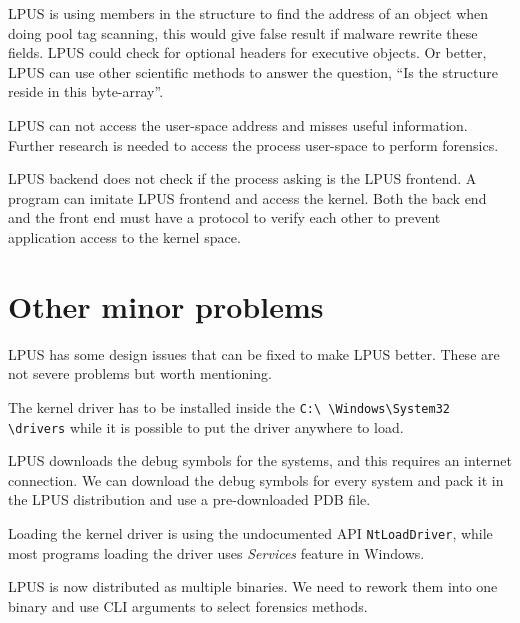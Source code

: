 LPUS is using members in the structure to find the address of an object when
doing pool tag scanning, this would give false result if malware rewrite these
fields.  LPUS could check for optional headers for executive objects. Or
better, LPUS can use other scientific methods to answer the question, ``Is the
structure reside in this byte-array''.

LPUS can not access the user-space address and misses useful information.
Further research is needed to access the process user-space to perform
forensics.

LPUS backend does not check if the process asking is the LPUS frontend. A
program can imitate LPUS frontend and access the kernel. Both the back end and
the front end must have a protocol to verify each other to prevent application
access to the kernel space.

\section[Other minor problems]{Other minor problems}

LPUS has some design issues that can be fixed to make LPUS better. These are
not severe problems but worth mentioning.

The kernel driver has to be installed inside the \texttt{C:\textbackslash
\textbackslash Windows\textbackslash System32 \textbackslash drivers} while it
is possible to put the driver anywhere to load.

LPUS downloads the debug symbols for the systems, and this requires an internet
connection. We can download the debug symbols for every system and pack it in
the LPUS distribution and use a pre-downloaded PDB file.

Loading the kernel driver is using the undocumented API \texttt{NtLoadDriver},
while most programs loading the driver uses \textit{Services} feature in
Windows.

LPUS is now distributed as multiple binaries. We need to rework them into one
binary and use CLI arguments to select forensics methods.

